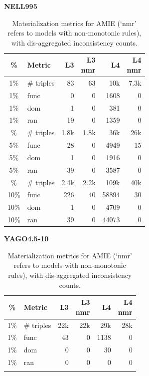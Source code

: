\documentclass[a4paper,UKenglish,cleveref, autoref, thm-restate]{tgdk-v2021}
\begin{document}
\begin{table}[]
\centering
\scriptsize
\setlength{\tabcolsep}{3pt}
\renewcommand{\arraystretch}{1.12}
\caption{Materialization metrics for AMIE (`nmr' refers to models with non-monotonic rules), with dis-aggregated inconsistency counts.}
\label{tab:mat_amie_10_30_notot_time}
\begin{minipage}[t]{0.49\linewidth}
\centering
\textbf{NELL995}\\
\begin{tabular}{c l | r r r r}
\toprule
\% & Metric & L3 & \shortstack{L3\\nmr} & L4 & \shortstack{L4\\nmr} \\
\midrule
1\% & \# triples & 83 & 63 & 10k & 7.3k \\
1\% & func & 0 & 0 & 1608 & 0 \\
1\% & dom & 1 & 0 & 381 & 0 \\
1\% & ran & 19 & 0 & 1359 & 0 \\
\addlinespace
5\% & \# triples & 1.8k & 1.8k & 36k & 26k \\
5\% & func & 28 & 0 & 4949 & 15 \\
5\% & dom & 1 & 0 & 1916 & 0 \\
5\% & ran & 39 & 0 & 3587 & 0 \\
\addlinespace
10\% & \# triples & 2.4k & 2.2k & 109k & 40k \\
10\% & func & 226 & 40 & 58894 & 30 \\
10\% & dom & 1 & 0 & 4709 & 0 \\
10\% & ran & 39 & 0 & 44073 & 0 \\
\bottomrule
\end{tabular}
\end{minipage}%
\hfill
\begin{minipage}[t]{0.49\linewidth}
\centering
\textbf{YAGO4.5-10}\\
\begin{tabular}{c l | r r r r}
\toprule
\% & Metric & L3 & \shortstack{L3\\nmr} & L4 & \shortstack{L4\\nmr} \\
\midrule
1\% & \# triples & 22k & 22k & 29k & 28k \\
1\% & func & 43 & 0 & 1138 & 0 \\
1\% & dom & 0 & 0 & 30 & 0 \\
1\% & ran & 0 & 0 & 0 & 0 \\
\addlinespace

\end{tabular}
\end{minipage}
\end{table}
\end{document}

